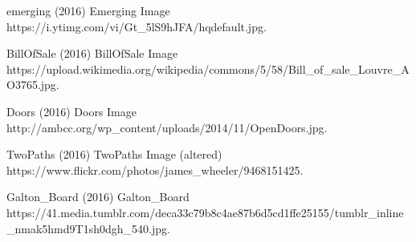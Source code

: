 \begin{frame}[allowframebreaks]
{\begin{thebibliography}{99}
 emerging (2016)
\newblock Emerging Image
\newblock https://i.ytimg.com/vi/Gt\_5lS9hJFA/hqdefault.jpg.

 BillOfSale (2016)
\newblock BillOfSale Image
\newblock https://upload.wikimedia.org/wikipedia/commons/5/58/Bill\_of\_sale\_Louvre\_AO3765.jpg.

 Doors (2016)
\newblock Doors Image
\newblock http://ambcc.org/wp\_content/uploads/2014/11/OpenDoors.jpg.

 TwoPaths (2016)
\newblock TwoPaths Image (altered)
\newblock https://www.flickr.com/photos/james\_wheeler/9468151425.

 Galton\_Board (2016)
\newblock Galton\_Board
\newblock https://41.media.tumblr.com/deca33c79b8c4ae87b6d5cd1ffe25155/tumblr\_inline\_nmak5hmd9T1sh0dgh\_540.jpg.


\end{thebibliography}
}
\end{frame}

